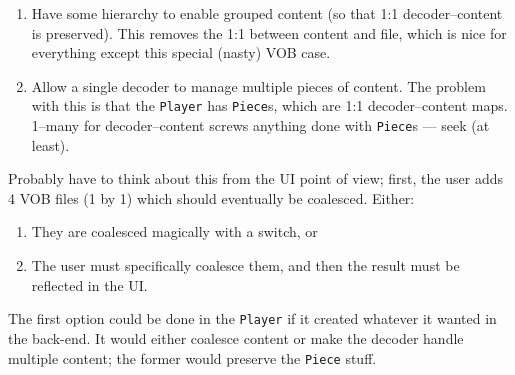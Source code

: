 \documentclass{article}
\begin{document}
\begin{enumerate}
\item Have some hierarchy to enable grouped content (so that 1:1
  decoder--content is preserved).  This removes the 1:1 between
  content and file, which is nice for everything except this
  special (nasty) VOB case.
\item Allow a single decoder to manage multiple pieces of content.
  The problem with this is that the \texttt{Player} has
  \texttt{Piece}s, which are 1:1 decoder--content maps.  1--many for
  decoder--content screws anything done with \texttt{Piece}s --- seek
  (at least).
\end{enumerate}

Probably have to think about this from the UI point of view; first,
the user adds 4 VOB files (1 by 1) which should eventually be
coalesced.  Either:

\begin{enumerate}
\item They are coalesced magically with a switch, or
\item The user must specifically coalesce them, and then the result
  must be reflected in the UI.
\end{enumerate}

The first option could be done in the \texttt{Player} if it created
whatever it wanted in the back-end.  It would either coalesce content
or make the decoder handle multiple content; the former would preserve
the \texttt{Piece} stuff.
\end{document}
